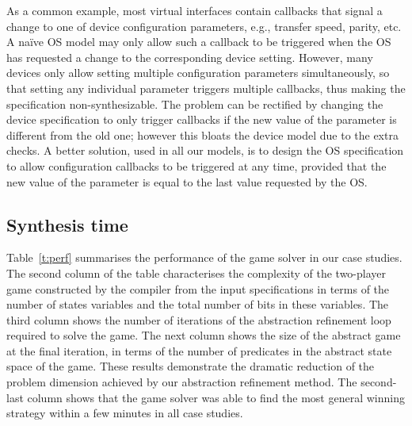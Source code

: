 As a common example, most virtual interfaces contain callbacks that signal a change to one of device configuration parameters, e.g., transfer speed, parity, etc.  A na\"ive OS model may only allow such a callback to be triggered when the OS has requested a change to the corresponding device setting.  However, many devices only allow setting multiple configuration parameters simultaneously, so that setting any individual parameter triggers multiple callbacks, thus making the specification non-synthesizable.  The problem can be rectified by changing the device specification to only trigger callbacks if the new value of the parameter is different from the old one; however this bloats the device model due to the extra checks.  A better solution, used in all our models, is to design the OS specification to allow configuration callbacks to be triggered at any time, provided that the new value of the parameter is equal to the last value requested by the OS. 

\subsection{Synthesis time} 
Table~\ref{t:perf} summarises the performance of the \termite game solver in our case studies.  The second column of the table characterises the complexity of the two-player game constructed by the \tsl compiler from the input specifications in terms of the number of states variables and the total number of bits in these variables.  The third column shows the number of iterations of the abstraction refinement loop required to solve the game.  The next column shows the size of the abstract game at the final iteration, in terms of the number of predicates in the abstract state space of the game.  These results demonstrate the dramatic reduction of the problem dimension achieved by our abstraction refinement method.  The second-last column shows that the \termite game solver was able to find the most general winning strategy within a few minutes in all case studies.

